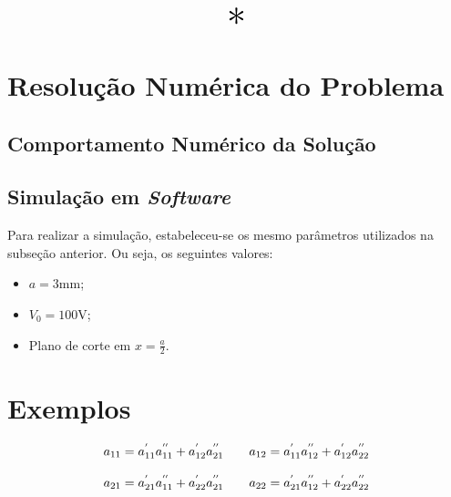 \documentclass{report}
\let\oldsection\section
\renewcommand\section{\clearpage\oldsection}
\begin{document}
\begin{center}
  \[ \scalebox{3}{$ * $} \]
\end{center}

\section{Resolução Numérica do Problema}
\label{sec:numerical}
\subsection{Comportamento Numérico da Solução}
\subsection{Simulação em \textit{Software}}

Para realizar a simulação, estabeleceu-se os mesmo parâmetros utilizados na subseção anterior. Ou seja, os seguintes valores:

\begin{itemize}
  \item $ a = 3 \text{mm}$;
  \item $ V_0 = 100 \text{V}$;
  \item Plano de corte em $ x = \frac{a}{2} $.
\end{itemize}



\section{Exemplos}

\begin{equation}
  \label{eq:quad_cascade}
  \centering
  \begin{matrix}
    a_{11} = a^{'}_{11}a^{''}_{11} + a^{'}_{12}a^{''}_{21} & \hspace{10pt} a_{12} = a^{'}_{11}a^{''}_{12} + a^{'}_{12}a^{''}_{22} \\\\
    a_{21} = a^{'}_{21}a^{''}_{11} + a^{'}_{22}a^{''}_{21} & \hspace{10pt} a_{22} = a^{'}_{21}a^{''}_{12} + a^{'}_{22}a^{''}_{22}
  \end{matrix}
\end{equation}
\end{document}
